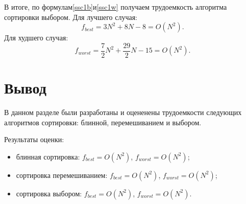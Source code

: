 В итоге, по формулам\text{~}\eqref{ssc1b}\text{~}и\text{~}\eqref{ssc1w} получаем трудоемкость алгоритма сортировки выбором. Для лучшего случая:
\begin{equation}\label{ssb}
	f_{best} = 3N^2 + 8N - 8 = O(N^2).
\end{equation}
Для худшего случая:
\begin{equation}\label{ssw}
	f_{worst} = \frac{7}{2}N^2 + \frac{29}{2}N - 15 = O(N^2).
\end{equation}

\section*{Вывод}

В данном разделе были разработаны и оцененены трудоемкости следующих алгоритмов сортировки: блинной, перемешиванием и выбором.

Результаты оценки:
\begin{itemize}
	\item блинная сортировка: $f_{best} = O(N^2)$, $f_{worst} = O(N^2)$;
	\item сортировка перемешиванием: $f_{best} = O(N^2)$, $f_{worst} = O(N^2)$;
	\item сортировка выбором: $f_{best} = O(N^2)$, $f_{worst} = O(N^2)$.
\end{itemize}

\clearpage
